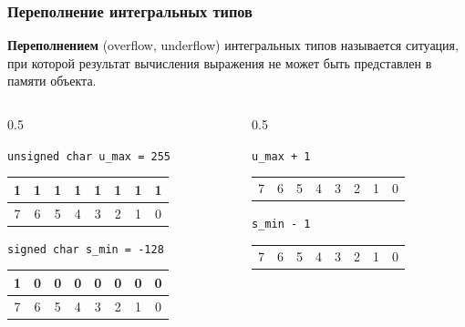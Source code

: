 \documentclass[compress, 8pt, aspectratio=169]{beamer}
\newenvironment{eightbit}{%
    \begin{center}
        \begin{tabular}{ |m{0.2cm}|m{0.2cm}|m{0.2cm}|m{0.2cm}|m{0.2cm}|m{0.2cm}|m{0.2cm}|m{0.2cm}|  }
            \hline
}{
        \hline
        \multicolumn{1}{c}{\color{gray}\tiny{7}} &
        \multicolumn{1}{c}{\color{gray}\tiny{6}} &
        \multicolumn{1}{c}{\color{gray}\tiny{5}} &
        \multicolumn{1}{c}{\color{gray}\tiny{4}} &
        \multicolumn{1}{c}{\color{gray}\tiny{3}} &
        \multicolumn{1}{c}{\color{gray}\tiny{2}} &
        \multicolumn{1}{c}{\color{gray}\tiny{1}} &
        \multicolumn{1}{c}{\color{gray}\tiny{0}} \\
        \end{tabular}
    \end{center}
}
\begin{document}
\begin{frame}[fragile]

    \frametitle{Переполнение интегральных типов}

    \textbf{Переполнением} (overflow, underflow) интегральных типов
    называется ситуация, при которой результат вычисления выражения
    не может быть представлен в памяти объекта.

    \hfill \break

    \begin{columns}[T]

        \begin{column}{0.5\textwidth}

            \verb|unsigned char u_max = 255|

            \begin{eightbit}
                1 & 1 & 1 & 1 & 1 & 1 & 1 & 1 \\
            \end{eightbit}

            \verb|signed char s_min = -128|

            \begin{eightbit}
                1 & 0 & 0 & 0 & 0 & 0 & 0 & 0 \\
            \end{eightbit}

        \end{column}

        \begin{column}{0.5\textwidth}

            \verb|u_max + 1|

            \begin{eightbit}
                \color{red}{?} &
                \color{red}{?} &
                \color{red}{?} &
                \color{red}{?} &
                \color{red}{?} &
                \color{red}{?} &
                \color{red}{?} &
                \color{red}{?} \\
            \end{eightbit}

            \verb|s_min - 1|

            \begin{eightbit}
                \color{red}{?} &
                \color{red}{?} &
                \color{red}{?} &
                \color{red}{?} &
                \color{red}{?} &
                \color{red}{?} &
                \color{red}{?} &
                \color{red}{?} \\
            \end{eightbit}

        \end{column}

    \end{columns}

\end{frame}
\end{document}
